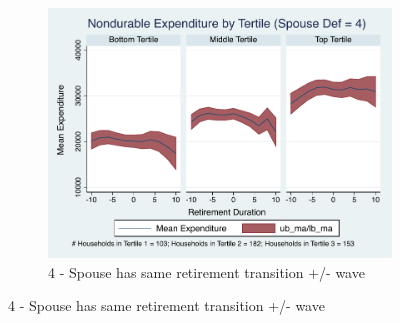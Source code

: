 \documentclass[11pt,onecolumn]{article}
\numberwithin{figure}{section}
\begin{document}
\begin{figure}
\begin{subfigure}{1.0\textwidth}
	\caption{4 - Spouse has same retirement transition +/- wave}
	\centering
	\includegraphics[width=0.8\linewidth]{../ConsumptionPostRetirement_by_SpouseDef/Smoothed/spouse_def_4.pdf}
	\end{subfigure}
	\vspace{1cm}
	

\end{figure}
\end{document}
